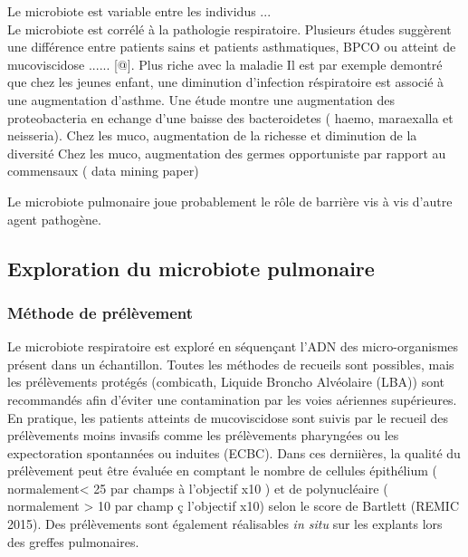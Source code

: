 \documentclass[12pt,a4paper]{article}
\begin{document}
Le microbiote est variable entre les individus ... \\
Le microbiote est corrélé à la pathologie respiratoire. Plusieurs études suggèrent une différence entre patients sains et patients asthmatiques, BPCO ou atteint de mucoviscidose ...... [@].
Plus riche avec la maladie
Il est par exemple demontré que chez les jeunes enfant, une diminution d'infection réspiratoire est associé à une augmentation d'asthme. Une étude montre une augmentation des proteobacteria en echange d'une baisse des bacteroidetes ( haemo, maraexalla et neisseria).
Chez les muco, augmentation de la richesse et diminution de la diversité 
Chez les muco, augmentation des germes opportuniste par rapport au commensaux ( data mining paper)

Le microbiote pulmonaire joue probablement le rôle de barrière vis à vis d'autre agent pathogène. \cite{HoMan2017}

\subsection{Exploration du microbiote pulmonaire}

\subsubsection{Méthode de prélèvement}
Le microbiote respiratoire est exploré en séquençant l'ADN des micro-organismes présent dans un échantillon. 
Toutes les méthodes de recueils sont possibles, mais les prélèvements protégés (combicath, Liquide Broncho Alvéolaire (LBA)) sont recommandés afin
d’éviter une contamination par les voies aériennes supérieures. En pratique, les patients atteints de mucoviscidose sont suivis par le recueil des prélèvements moins invasifs comme les prélèvements pharyngées ou les expectoration spontannées ou induites (ECBC). Dans ces derniières, la qualité du prélèvement peut être évaluée en comptant le nombre de cellules épithélium ( normalement< 25 par champs à l'objectif x10 ) et de polynucléaire ( normalement > 10 par champ ç l'objectif x10) selon le score de Bartlett (REMIC 2015). Des prélèvements sont également réalisables \textit{in situ}  sur les explants lors des greffes pulmonaires.
\end{document}
